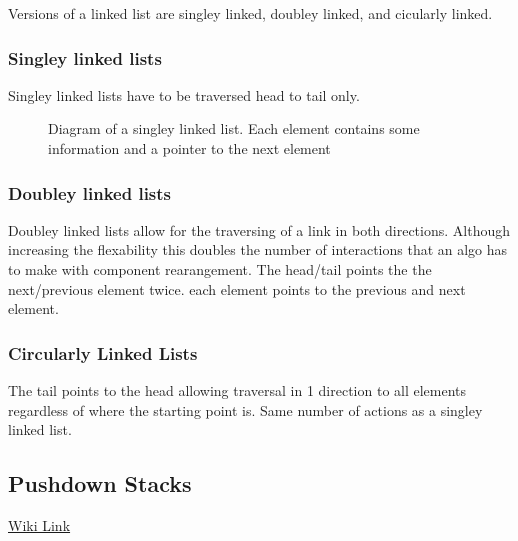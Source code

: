 Versions of a linked list are singley linked, doubley linked, and cicularly linked. 

\subsubsection{Singley linked lists}
Singley linked lists have to be traversed head to tail only.

\begin{figure}
	\centering
{}
	\caption{Diagram of a singley linked list. Each element contains some information and a pointer to the next element}
\end{figure}

\subsubsection{Doubley linked lists}
Doubley linked lists allow for the traversing of a link in both directions. Although increasing the flexability this doubles the number of interactions that an algo has to make with component rearangement.
The head/tail points the the next/previous element twice. each element points to the previous and next element.

\subsubsection{Circularly Linked Lists}
The tail points to the head allowing traversal in 1 direction to all elements regardless of where the starting point is.
Same number of actions as a singley linked list.

\subsection{Pushdown Stacks}
	\href{https://en.wikipedia.org/wiki/Stack_(abstract_data_type)}{Wiki Link}


